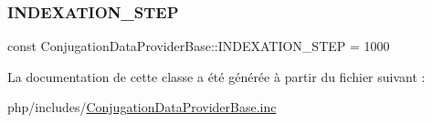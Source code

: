 \subsubsection{\texorpdfstring{I\+N\+D\+E\+X\+A\+T\+I\+O\+N\+\_\+\+S\+T\+EP}{INDEXATION\_STEP}}
{\footnotesize\ttfamily const Conjugation\+Data\+Provider\+Base\+::\+I\+N\+D\+E\+X\+A\+T\+I\+O\+N\+\_\+\+S\+T\+EP = 1000}



La documentation de cette classe a été générée à partir du fichier suivant \+:\begin{DoxyCompactItemize}
\item 
php/includes/\hyperlink{_conjugation_data_provider_base_8inc}{Conjugation\+Data\+Provider\+Base.\+inc}\end{DoxyCompactItemize}
